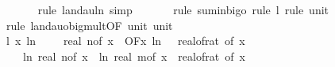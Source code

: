 \begin{isabellebody}
\ \ \ \ \ \isamarkupfalse%
\ {\isacharparenleft}{\kern0pt}rule\ landau{\isacharunderscore}{\kern0pt}ln{\isacharunderscore}{\kern0pt}{}{\isacharcomma}{\kern0pt}\ simp{\isacharparenright}{\kern0pt}\isanewline
\ \ \ \ \ \isamarkupfalse%
\ {\isacharparenleft}{\kern0pt}rule\ sum{\isacharunderscore}{\kern0pt}in{\isacharunderscore}{\kern0pt}bigo{\isacharcomma}{\kern0pt}\ rule\ l{}{\isacharcomma}{\kern0pt}\ rule\ unit{\isacharunderscore}{\kern0pt}{}{\isacharparenright}{\kern0pt}\isanewline
\ \ \ \ \isamarkupfalse%
\ {\isacharparenleft}{\kern0pt}rule\ landau{\isacharunderscore}{\kern0pt}o{\isachardot}{\kern0pt}big{\isacharunderscore}{\kern0pt}mult{\isacharunderscore}{\kern0pt}{}{\isacharbrackleft}{\kern0pt}OF\ unit{\isacharunderscore}{\kern0pt}{}\ unit{\isacharunderscore}{\kern0pt}{}{\isacharbrackright}{\kern0pt}{\isacharparenright}{\kern0pt}\isanewline
\isanewline
\ \ \isamarkupfalse%
\ l{}{\isacharcolon}{\kern0pt}\ {\isachardoublequoteopen}{\isacharparenleft}{\kern0pt}{\isasymlambda}x{\isachardot}{\kern0pt}\ ln\ {\isacharparenleft}{\kern0pt}{}\ {\isacharplus}{\kern0pt}\ {}\ {\isacharasterisk}{\kern0pt}\ real\ {\isacharparenleft}{\kern0pt}n{\isacharunderscore}{\kern0pt}of\ x{\isacharparenright}{\kern0pt}{\isacharparenright}{\kern0pt}{\isacharparenright}{\kern0pt}\ {\isasymin}\ O{\isacharbrackleft}{\kern0pt}{\isacharquery}{\kern0pt}F{\isacharbrackright}{\kern0pt}{\isacharparenleft}{\kern0pt}{\isasymlambda}x{\isachardot}{\kern0pt}\ ln\ {\isacharparenleft}{\kern0pt}{}\ {\isacharslash}{\kern0pt}\ real{\isacharunderscore}{\kern0pt}of{\isacharunderscore}{\kern0pt}rat\ {\isacharparenleft}{\kern0pt}{\isasymepsilon}{\isacharunderscore}{\kern0pt}of\ x{\isacharparenright}{\kern0pt}{\isacharparenright}{\kern0pt}\ {\isacharasterisk}{\kern0pt}\ \isanewline
\ \ \ \ {\isacharparenleft}{\kern0pt}ln\ {\isacharparenleft}{\kern0pt}real\ {\isacharparenleft}{\kern0pt}n{\isacharunderscore}{\kern0pt}of\ x{\isacharparenright}{\kern0pt}{\isacharparenright}{\kern0pt}\ {\isacharplus}{\kern0pt}\ ln\ {\isacharparenleft}{\kern0pt}real\ {\isacharparenleft}{\kern0pt}m{\isacharunderscore}{\kern0pt}of\ x{\isacharparenright}{\kern0pt}{\isacharparenright}{\kern0pt}{\isacharparenright}{\kern0pt}\ {\isacharslash}{\kern0pt}\ {\isacharparenleft}{\kern0pt}real{\isacharunderscore}{\kern0pt}of{\isacharunderscore}{\kern0pt}rat\ {\isacharparenleft}{\kern0pt}{\isasymdelta}{\isacharunderscore}{\kern0pt}of\ x{\isacharparenright}{\kern0pt}{\isacharparenright}{\kern0pt}\isanewline

\end{isabellebody}
